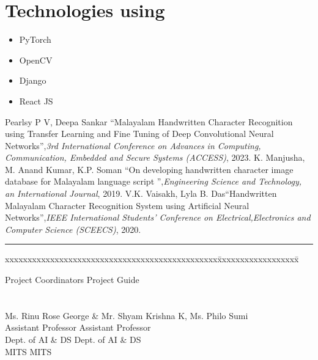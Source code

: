 \documentclass{article}
\begin{document}
\section{Technologies using}
\begin{itemize}
    \item PyTorch
    \item OpenCV
    \item Django
    \item React JS
\end{itemize}

	

\begin{thebibliography}{999}


 Pearlsy P V, Deepa Sankar \textquotedblleft Malayalam Handwritten Character Recognition using Transfer Learning and Fine Tuning of Deep Convolutional Neural Networks\textquotedblright,\textit{3rd International Conference on Advances in Computing, Communication, Embedded and Secure Systems (ACCESS)}, 2023.
 K. Manjusha, M. Anand Kumar, K.P. Soman \textquotedblleft On developing handwritten character image database for Malayalam language script \textquotedblright,\textit{Engineering Science and Technology, an International Journal}, 2019.
 V.K. Vaisakh, Lyla B. Das\textquotedblleft Handwritten Malayalam Character Recognition System using Artificial Neural Networks\textquotedblright,\textit{IEEE International Students' Conference on Electrical,Electronics and Computer Science (SCEECS)}, 2020.



\end{thebibliography}
\vspace{0.2in}
\hrule
\vspace{.3in}

\hspace{-.25in}
\begin{tabbing}
xxxxxxxxxxxxxxxxxxxxxxxxxxxxxxxxxxxxxxxxxxxxxxx\= xxxxxxxxxxxxxxxxxx\= \kill

Project Coordinators \>\>\>\> Project Guide
\\
\\
\\
Ms. Rinu Rose George \& Mr. Shyam Krishna K, \>\> Ms.  Philo Sumi \\
Assistant Professor \>\> Assistant Professor\\
Dept. of AI \& DS \>\> Dept. of AI \& DS\\
MITS \>\> MITS
\end{tabbing}
\end{document}
